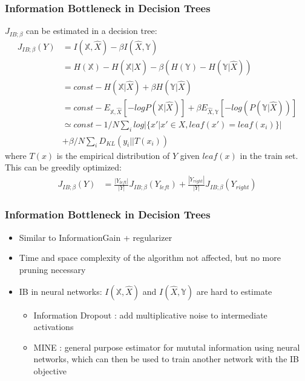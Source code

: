 \begin{frame}
    \frametitle{Information Bottleneck in Decision Trees}
    

    $J_{IB;\beta}$ can be estimated in a decision tree:
    \begin{align*}
        J_{IB;\beta}(Y) &= I(\mathbb{X}, \hat{X}) - \beta I(\hat{X}, \mathbb{Y}) \\
        &= H(\mathbb{X}) - H(\mathbb{X}|\hat{X}) - \beta (H(\mathbb{Y}) - H(\mathbb{Y} | \hat{X})) \\
        &= const - H(\mathbb{X}|\hat{X}) + \beta H(\mathbb{Y} | \hat{X}) \\
        &= const - E_{\mathbb{X},\hat{X}}[-log P(\mathbb{X}|\hat{X})] + \beta E_{\hat{X},\mathbb{Y}}[-log(P(\mathbb{Y}|\hat{X}))] \\
        & \simeq const - 1/N \sum_i log |\{x' |x' \in X, leaf(x')=leaf(x_i)\}| \\
        &+ \beta /N \sum_i D_{KL}(y_i|| T(x_i))
        \label{eq:2}
    \end{align*}
    where $T(x)$ is the empirical distribution of $Y$ given $leaf(x)$ in the train set. \newline
    This can be greedily optimized:
    \begin{align*}
        J_{IB;\beta}(Y) &= \frac{|Y_{left}|}{|Y|} J_{IB;\beta}(Y_{left}) + \frac{|Y_{right}|}{|Y|} J_{IB;\beta}(Y_{right})
    \end{align*}
\end{frame}


\begin{frame}
\frametitle{Information Bottleneck in Decision Trees}
    \begin{itemize}
        \item Similar to InformationGain + regularizer
        \item Time and space complexity of the algorithm not affected, but no more pruning necessary
        \item IB in neural networks: $I(\mathbb{X}, \hat{X})$ and $I(\hat{X}, \mathbb{Y})$ are hard to estimate
        \begin{itemize}
            \item Information Dropout \cite{achille_information_2017}: add multiplicative noise to intermediate activations
            \item MINE \cite{belghazi_mine_2018}: general purpose estimator for mututal information using neural networks, which can then be used to train another network with the IB objective
        \end{itemize}
    \end{itemize}


\end{frame}